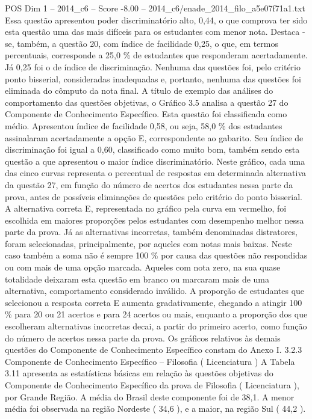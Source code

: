 \begin{textsample}{POS Dim 1 – 2014\_c6 – Score -8.00 – 2014\_c6/enade\_2014\_filo\_a5e07f71a1.txt}
Essa questão apresentou poder discriminatório alto, 0,44, o que comprova ter sido esta questão uma das mais difíceis para os estudantes com menor nota.
Destaca -se, também, a questão 20, com índice de facilidade 0,25, o que, em termos percentuais, corresponde a 25,0 \% de estudantes que responderam acertadamente.
Já 0,25 foi o de índice de discriminação.
Nenhuma das questões foi, pelo critério ponto bisserial, consideradas inadequadas e, portanto, nenhuma das questões foi eliminada do cômputo da nota final.
A título de exemplo das análises do comportamento das questões objetivas, o Gráfico 3.5 analisa a questão 27 do Componente de Conhecimento Específico.
Esta questão foi classificada como médio.
Apresentou índice de facilidade 0,58, ou seja, 58,0 \% dos estudantes assinalaram acertadamente a opção E, correspondente ao gabarito.
Seu índice de discriminação foi igual a 0,60, classificado como muito bom, também sendo esta questão a que apresentou o maior índice discriminatório.
Neste gráfico, cada uma das cinco curvas representa o percentual de respostas em determinada alternativa da questão 27, em função do número de acertos dos estudantes nessa parte da prova, antes de possíveis eliminações de questões pelo critério do ponto bisserial.
A alternativa correta E, representada no gráfico pela curva em vermelho, foi escolhida em maiores proporções pelos estudantes com desempenho melhor nessa parte da prova.
Já as alternativas incorretas, também denominadas distratores, foram selecionadas, principalmente, por aqueles com notas mais baixas.
Neste caso também a soma não é sempre 100 \% por causa das questões não respondidas ou com mais de uma opção marcada.
Aqueles com nota zero, na sua quase totalidade deixaram esta questão em branco ou marcaram mais de uma alternativa, comportamento considerado inválido.
A proporção de estudantes que selecionou a resposta correta E aumenta gradativamente, chegando a atingir 100 \% para 20 ou 21 acertos e para 24 acertos ou mais, enquanto a proporção dos que escolheram alternativas incorretas decai, a partir do primeiro acerto, como função do número de acertos nessa parte da prova.
Os gráficos relativos às demais questões do Componente de Conhecimento Específico constam do Anexo I. 3.2.3 Componente de Conhecimento Específico – Filosofia ( Licenciatura ) A Tabela 3.11 apresenta as estatísticas básicas em relação às questões objetivas do Componente de Conhecimento Específico da prova de Filosofia ( Licenciatura ), por Grande Região.
A média do Brasil deste componente foi de 38,1.
A menor média foi observada na região Nordeste ( 34,6 ), e a maior, na região Sul ( 44,2 ).

\end{textsample}
